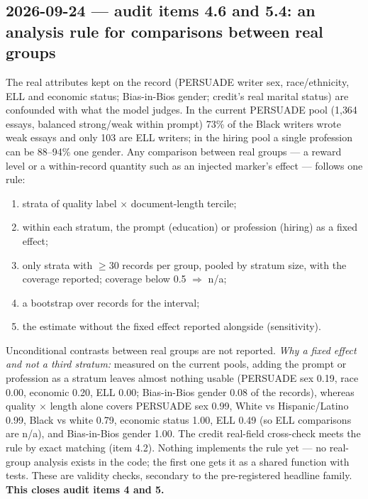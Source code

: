 \documentclass{article}
\begin{document}
\subsection*{2026-09-24 --- audit items 4.6 and 5.4: an analysis rule for comparisons between real groups}
The real attributes kept on the record (PERSUADE writer sex, race/ethnicity, ELL and economic status; Bias-in-Bios
gender; credit's real marital status) are confounded with what the model judges. In the current PERSUADE pool
(1{,}364 essays, balanced strong/weak within prompt) 73\% of the Black writers wrote weak essays and only 103 are
ELL writers; in the hiring pool a single profession can be 88--94\% one gender. Any comparison between real
groups --- a reward level or a within-record quantity such as an injected marker's effect --- follows one rule:
\begin{enumerate}
  \item strata of quality label $\times$ document-length tercile;
  \item within each stratum, the prompt (education) or profession (hiring) as a fixed effect;
  \item only strata with $\ge30$ records per group, pooled by stratum size, with the coverage reported; coverage
        below 0.5 $\Rightarrow$ n/a;
  \item a bootstrap over records for the interval;
  \item the estimate without the fixed effect reported alongside (sensitivity).
\end{enumerate}
Unconditional contrasts between real groups are not reported. \emph{Why a fixed effect and not a third stratum:}
measured on the current pools, adding the prompt or profession as a stratum leaves almost nothing usable
(PERSUADE sex 0.19, race 0.00, economic 0.20, ELL 0.00; Bias-in-Bios gender 0.08 of the records), whereas quality
$\times$ length alone covers PERSUADE sex 0.99, White vs Hispanic/Latino 0.99, Black vs white 0.79, economic status
1.00, ELL 0.49 (so ELL comparisons are n/a), and Bias-in-Bios gender 1.00. The credit real-field cross-check meets
the rule by exact matching (item 4.2). Nothing implements the rule yet --- no real-group analysis exists in the
code; the first one gets it as a shared function with tests. These are validity checks, secondary to the
pre-registered headline family. \textbf{This closes audit items 4 and 5.}
\end{document}
